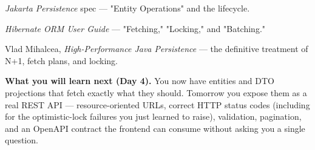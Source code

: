 \begin{wbitem}
  \item \emph{Jakarta Persistence} spec --- "Entity Operations" and the  lifecycle.
  \item \emph{Hibernate ORM User Guide} --- "Fetching," "Locking," and "Batching."
  \item Vlad Mihalcea, \emph{High-Performance Java Persistence} --- the definitive treatment of N+1, fetch plans, and locking.
\end{wbitem}

\begin{keyidea}
\textbf{What you will learn next (Day 4).} You now have entities and DTO projections that fetch exactly what they should. Tomorrow you expose them as a real REST API --- resource-oriented URLs, correct HTTP status codes (including  for the optimistic-lock failures you just learned to raise), validation, pagination, and an OpenAPI contract the frontend can consume without asking you a single question.
\end{keyidea}
